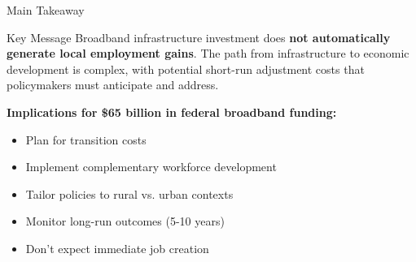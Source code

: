 \documentclass[aspectratio=169]{beamer}
\begin{document}
\begin{frame}{Main Takeaway}
\begin{block}{Key Message}
Broadband infrastructure investment does \textbf{not automatically generate local employment gains}. The path from infrastructure to economic development is complex, with potential short-run adjustment costs that policymakers must anticipate and address.
\end{block}



\vspace{0.5cm}

\textbf{Implications for \$65 billion in federal broadband funding:}
\begin{itemize}
    \item Plan for transition costs
    \item Implement complementary workforce development
    \item Tailor policies to rural vs. urban contexts
    \item Monitor long-run outcomes (5-10 years)
    \item Don't expect immediate job creation
\end{itemize}
\end{frame}
\end{document}
